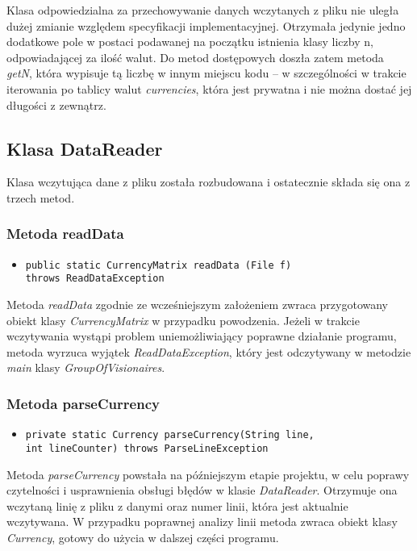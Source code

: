 \documentclass[a4paper,12pt]{article}
\newcommand\tab[1][0.6cm]{\hspace*{#1}}
\begin{document}
\tab Klasa odpowiedzialna za przechowywanie danych wczytanych z pliku nie uległa dużej zmianie względem specyfikacji implementacyjnej. Otrzymała jedynie jedno dodatkowe pole w postaci podawanej na początku istnienia klasy liczby n, odpowiadającej za ilość walut. Do metod dostępowych doszła zatem metoda \textit{getN}, która wypisuje tą liczbę w innym miejscu kodu -- w szczególności w trakcie iterowania po tablicy walut \textit{currencies}, która jest prywatna i nie można dostać jej długości z zewnątrz.

\subsection{Klasa DataReader}

\tab Klasa wczytująca dane z pliku została rozbudowana i ostatecznie składa się ona z trzech metod.

\subsubsection{Metoda readData}

\begin{itemize}
\item \begin{lstlisting}
public static CurrencyMatrix readData (File f)
throws ReadDataException
\end{lstlisting}
\end{itemize}

\tab Metoda \textit{readData} zgodnie ze wcześniejszym założeniem zwraca przygotowany obiekt klasy \textit{CurrencyMatrix} w przypadku powodzenia. Jeżeli w trakcie wczytywania wystąpi problem uniemożliwiający poprawne działanie programu, metoda wyrzuca wyjątek \textit{ReadDataException}, który jest odczytywany w metodzie \textit{main} klasy \textit{GroupOfVisionaires}.

\subsubsection{Metoda parseCurrency}

\begin{itemize}
\item \begin{lstlisting}
private static Currency parseCurrency(String line,
int lineCounter) throws ParseLineException
\end{lstlisting}
\end{itemize}

\tab Metoda \textit{parseCurrency} powstała na późniejszym etapie projektu, w celu poprawy czytelności i usprawnienia obsługi błędów w klasie \textit{DataReader}. Otrzymuje ona wczytaną linię z pliku z danymi oraz numer linii, która jest aktualnie wczytywana. W przypadku poprawnej analizy linii metoda zwraca obiekt klasy \textit{Currency}, gotowy do użycia w dalszej części programu. 
\end{document}
